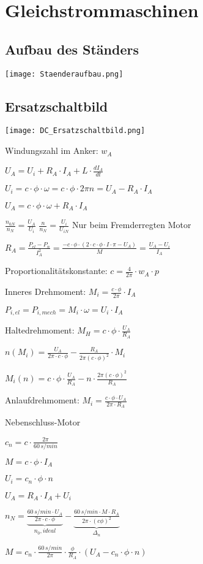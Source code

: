 \documentclass[german]{latex4ei/latex4ei_sheet}
\begin{document}
	\section{Gleichstrommaschinen}
		\begin{sectionbox}
			\subsection{Aufbau des Ständers}
				\texttt{[image: Staenderaufbau.png]}
			\subsection{Ersatzschaltbild}
				\texttt{[image: DC\_Ersatzschaltbild.png]}
				\begin{symbolbox}
					\item Windungszahl im Anker: $w_A$
					\item $U_A = U_i +R_A\cdot I_A+L\cdot \frac{dI_A}{dt}$
					\item $U_i = c\cdot \phi \cdot \omega = c \cdot \phi \cdot 2\pi n = U_A - R_A\cdot I_A$
					\item $U_A = c\cdot \phi \cdot \omega +R_A\cdot I_A$
					\item $\frac{n_{0N}}{n_N} = \frac{U_A}{U_i}$ \quad $\frac{n}{n_N} = \frac{U_i}{U_{iN}}$ Nur beim Fremderregten Motor
					\item $R_A = \frac{P_{el}-P_n}{I_A^2} = \frac{-c\cdot \phi\cdot (2\cdot c\cdot \phi \cdot I\cdot \pi - U_A)}{M} = \frac{U_A-U_i}{I_A}$
					\item Proportionalitätskonstante: $c =\frac{4}{2\pi}\cdot w_A\cdot p$
					\item Inneres Drehmoment: $M_i = \frac{c\cdot \phi}{2\pi} \cdot I_A$
					\item $ P_{i, el} = P_{i, mech} = M_i \cdot \omega = U_i\cdot I_A$
					\item Haltedrehmoment: $M_H = c\cdot \phi \cdot \frac{U_A}{R_A}$
					\item $n(M_i) = \frac{U_A}{2\pi\cdot c\cdot \phi}-\frac{R_A}{2\pi(c\cdot \phi)^2}\cdot M_i$
					\item $M_i(n) = c\cdot \phi\cdot \frac{U_A}{R_A}-n\cdot \frac{2\pi(c\cdot \phi)^2}{R_A}$
					\item Anlaufdrehmoment: $M_i = \frac{c\cdot \phi \cdot U_A}{2\pi \cdot R_A}$
				\end{symbolbox}

				\begin{bluebox}{Nebenschluss-Motor}
					\item $c_n = c\cdot \frac{2\pi}{60\,s/min}$
					\item $M = c\cdot \phi \cdot I_A$
					\item $U_i = c_n \cdot \phi \cdot n$
					\item $U_A = R_A\cdot I_A + U_i$
					\item $n_N = \underbrace{\frac{60\,s/min\cdot U_A}{2\pi\cdot c\cdot \phi}}_{n_0, ideal}-\underbrace{\frac{60\,s/min\cdot M\cdot R_A}{2\pi\cdot(c\phi)^2}}_{\Delta_n}$
					\item $M = c_n\cdot \frac{60\,s/min}{2\pi}\cdot \frac{\phi}{R_A}\cdot (U_A-c_n\cdot \phi \cdot n)$
				\end{bluebox}


\end{sectionbox}
\end{document}
